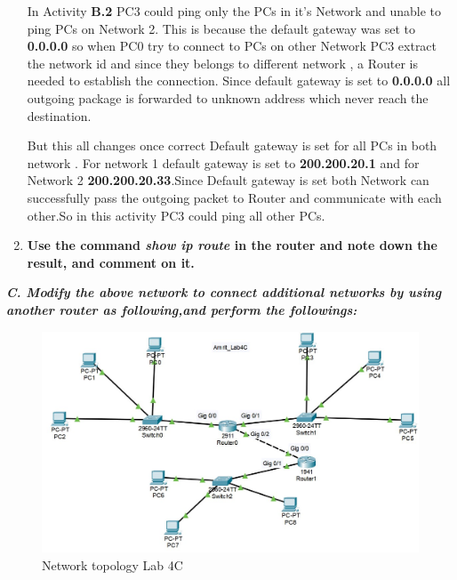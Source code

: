 \documentclass[a4paper,11pt]{article}
\begin{document}
\begin{enumerate}
            In Activity \textbf{B.2} PC3 could ping only the PCs in it's Network and unable to ping PCs on Network 2. This is because the default gateway was set to \textbf{0.0.0.0} so when PC0 try to connect to PCs on other Network PC3 extract the network id and since they belongs to different network , a Router is needed to establish the connection.
            Since default gateway is set to \textbf{0.0.0.0} all outgoing package is forwarded to unknown address which never reach the destination.

            But this all changes once correct Default gateway is set for all PCs in both network . For network 1 default gateway is set to \textbf{200.200.20.1} and for Network 2 \textbf{200.200.20.33}.Since Default gateway is set  both Network can successfully pass the outgoing packet to Router and communicate with each other.So in this activity PC3 could ping all other PCs.

      \item \textbf{Use the command \textit{show ip route} in the router and note down the result, and comment on it.}

\end{enumerate}

\pagebreak
{\bfseries \textit{C. Modify the above network to connect additional networks by using another router as following,and perform the followings:}}
\begin{figure}[H]
      \centering
      \includegraphics[scale=0.70,cframe=blue 0.5pt 3pt]{Lab4C.jpg}
      \caption{Network topology Lab 4C}
\end{figure}
\end{document}
